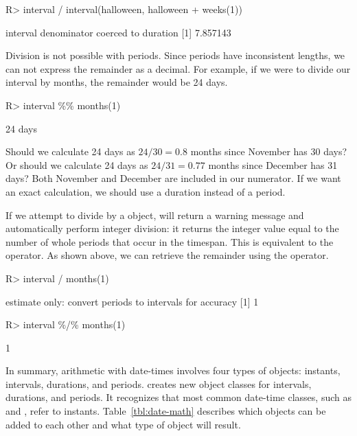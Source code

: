 \documentclass[article]{jss}
\begin{document}
\begin{CodeInput}
R> interval / interval(halloween, halloween + weeks(1))
\end{CodeInput}
\begin{CodeOutput}
interval denominator coerced to duration
[1] 7.857143
\end{CodeOutput}


Division is not possible with periods. Since periods have inconsistent lengths, we can not express the remainder as a decimal. For example, if we were to divide our interval by months, the remainder would be 24 days.

\begin{CodeInput}
R> interval \%\% months(1)
\end{CodeInput}
\begin{CodeOutput}
[1] 24 days
\end{CodeOutput}

Should we calculate 24 days as $24 / 30 = 0.8$ months since November has 30 days? Or should we calculate 24 days as $24 / 31 = 0.77$ months since December has 31 days? Both November and December are included in our numerator. If we want an exact calculation, we should use a duration instead of a period.

If we attempt to divide by a  object,  will return a warning message and automatically perform integer division: it returns the integer value equal to the number of whole periods that occur in the timespan. This is equivalent to the \code{\%/\%} operator. As shown above, we can retrieve the remainder using the \code{\%\%} operator.

\begin{CodeInput}
R> interval / months(1)
\end{CodeInput}
\begin{CodeOutput}
estimate only: convert periods to intervals for accuracy
[1] 1
\end{CodeOutput}

\begin{CodeInput}
R> interval \%/\% months(1)
\end{CodeInput}
\begin{CodeOutput}
[1] 1
\end{CodeOutput}

In summary, arithmetic with date-times involves four types of objects: instants, intervals, durations, and periods.  creates new object classes for intervals, durations, and periods. It recognizes that most common date-time classes, such as  and , refer to instants. Table~\ref{tbl:date-math} describes which objects can be added to each other and what type of object will result.
\end{document}
